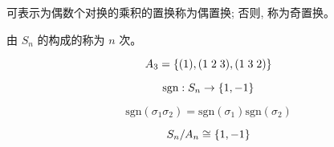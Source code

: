 \begin{frame}{}
  \begin{definition}
    可表示为偶数个对换的乘积的置换称为偶置换; 否则, 称为奇置换。
  \end{definition}

  \pause
  \vspace{0.80cm}
  \begin{definition}
    由 $S_{n}$ 的构成的称为 $n$ 次。
  \end{definition}

  \pause
  \[
    A_{3} = \{(1), (1\;2\;3), (1\;3\;2)\}
  \]
\end{frame}

\begin{frame}{}
  \[
    \text{sgn}: S_{n} \to \{1, -1\}
  \]

  \pause
  \[
    \text{sgn}(\sigma_{1}\sigma_{2}) = \text{sgn}(\sigma_{1})\text{sgn}(\sigma_{2})
  \]

  \pause
  \[
    S_{n}/A_{n} \cong \{1, -1\}
  \]
\end{frame}

\begin{frame}{}
\end{frame}
